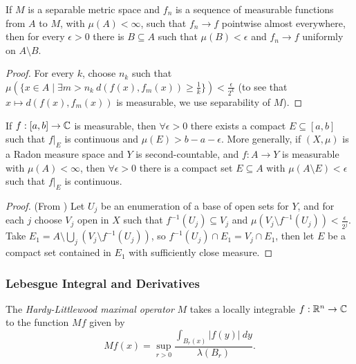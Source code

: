 
\begin{thm} If $M$ is a separable metric space and $f_n$ is a sequence of measurable functions from $A$ to $M$, with $\mu(A) < \infty$, such that $f_n \rightarrow f$ pointwise almost everywhere, then for every $\epsilon > 0$ there is $B \subseteq A$ such that $\mu(B) < \epsilon$ and $f_n \rightarrow f$ uniformly on $A\setminus B$.
\end{thm}
\begin{proof} For every $k$, choose $n_k$ such that $\mu(\{x \in A \mid \exists m > n_k\ d(f(x),f_m(x)) \ge \frac{1}{k}\}) < \frac{\epsilon}{2^k}$ (to see that $x \mapsto d(f(x),f_m(x))$ is measurable, we use separability of $M$).
\end{proof}

\begin{thm}\label{lusin} If $f : [a,b] \rightarrow \mathbb{C}$ is measurable, then $\forall \epsilon > 0$ there exists a compact $E \subseteq [a,b]$ such that $f|_E$ is continuous and $\mu(E) > b-a-\epsilon$. More generally, if $(X,\mu)$ is a Radon measure space and $Y$ is second-countable, and $f : A \rightarrow Y$ is measurable with $\mu(A) < \infty$, then $\forall \epsilon > 0$ there is a compact set $E \subseteq A$ with $\mu(A\setminus E) < \epsilon$ such that $f|_E$ is continuous.
\end{thm}
\begin{proof} (From \cite{feldman-lusin}) Let $U_j$ be an enumeration of a base of open sets for $Y$, and for each $j$ choose $V_j$ open in $X$ such that $f^{-1}(U_j) \subseteq V_j$ and $\mu(V_j \setminus f^{-1}(U_j)) < \frac{\epsilon}{2^j}$. Take $E_1 = A\setminus \bigcup_j (V_j \setminus f^{-1}(U_j))$, so $f^{-1}(U_j) \cap E_1 = V_j\cap E_1$, then let $E$ be a compact set contained in $E_1$ with sufficiently close measure.
\end{proof}


\subsubsection{Lebesgue Integral and Derivatives}

\begin{defn} The \emph{Hardy-Littlewood maximal operator} $M$ takes a locally integrable $f : \mathbb{R}^n \rightarrow \mathbb{C}$ to the function $Mf$ given by
\[
Mf(x) = \sup_{r > 0} \frac{\int_{B_r(x)} |f(y)|\ dy}{\lambda(B_r)}.
\]
\end{defn}

